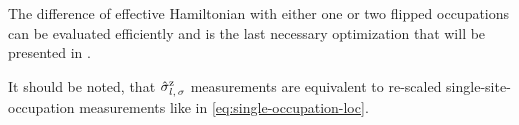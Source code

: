 The difference of effective Hamiltonian with either one or two flipped occupations can be evaluated efficiently and is the last necessary optimization that will be presented in .

It should be noted, that $\pauli[l,\,\sigma]{z}$ measurements are equivalent to re-scaled single-site-occupation measurements like in \autoref{eq:single-occupation-loc}.
